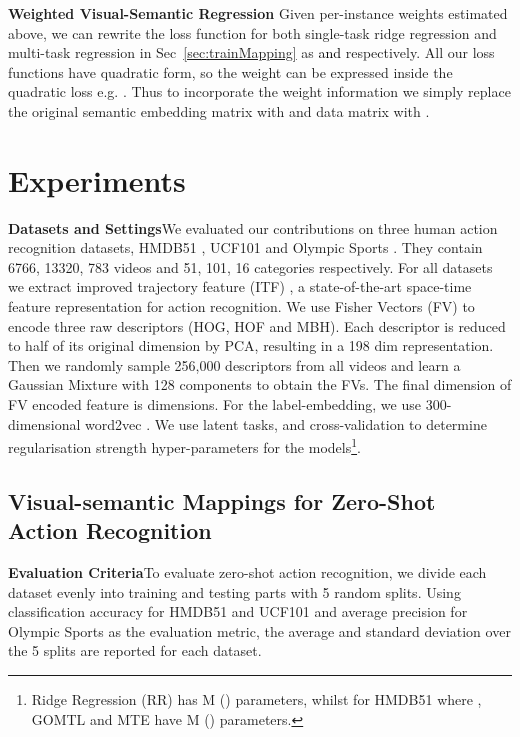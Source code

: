 \documentclass[runningheads]{llncs}
\begin{document}
\noindent\textbf{Weighted Visual-Semantic Regression}\quad
Given per-instance weights  estimated above, we can rewrite the loss function for both single-task ridge regression and multi-task regression in Sec~\ref{sec:trainMapping} as \textcolor{black}{ and } respectively. All our loss functions have quadratic form, so the weight can be expressed inside the quadratic loss e.g. . Thus to incorporate the weight information we simply replace the original semantic embedding matrix with  and data matrix with .




\section{Experiments}

\noindent\textbf{Datasets and Settings}\quad We evaluated our
contributions on three human action recognition datasets, HMDB51
\cite{Kuehne2011}, UCF101 \cite{Soomro2012} and Olympic Sports
\cite{Niebles2010}.  They contain 6766, 13320, 783 videos and 51, 101,
16 categories respectively. For all datasets we extract improved
trajectory feature (ITF) \cite{Wang2014}, a state-of-the-art
space-time feature representation for action recognition. We use Fisher Vectors (FV)
\cite{Perronnin2010} to encode three raw descriptors (HOG, HOF and
MBH). Each descriptor is reduced to half of its original dimension by
PCA, resulting in a 198 dim representation. Then we randomly sample
256,000 descriptors from all videos and learn a Gaussian Mixture with
128 components to obtain the FVs. The final dimension of FV encoded
feature is  dimensions. For the
label-embedding, we use 300-dimensional word2vec
\cite{Mikolov2013a}. We use  latent tasks, and
cross-validation to determine regularisation strength hyper-parameters
for the models\footnote{Ridge Regression (RR) has M
  () parameters, whilst for HMDB51 where
  , GOMTL and MTE have M ()
  parameters. }.



\subsection{Visual-semantic Mappings for Zero-Shot Action Recognition}

\noindent\textbf{Evaluation Criteria}\quad To evaluate
zero-shot action recognition, we  divide each dataset evenly into
training and testing parts with 5 random
splits. Using classification accuracy for HMDB51 and UCF101 and
average precision for Olympic Sports as the evaluation metric, the
average and  standard deviation over the 5 splits are reported for
each dataset. 
\end{document}
